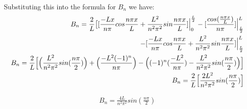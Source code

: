 \documentclass{article}
\begin{document}
Substituting this into the formula for $B_n$ we have:
\begin{equation}
\begin{aligned}
B_n = \frac{2}{L}\big{[}[ \frac{-Lx}{n\pi}cos\frac{n\pi x}{L} + \frac{L^2}{n^2\pi^2}sin\frac{n\pi x}{L}]\Big{|}^{\frac{L}{2}}_0 -[\frac{cos(\frac{n\pi x}{L})}{n\pi}]\Big{|}^L_{\frac{L}{2}}\\
-[\frac{-Lx}{n\pi}cos\frac{n\pi x}{L} + \frac{L^2}{n^2\pi^2}sin\frac{n\pi x}{L}]\Big{|}^L_{\frac{L}{2}}\\
B_n = \frac{2}{L}\Big{[}\Big{(}\frac{L^2}{n^2\pi^2}sin(\frac{n\pi}{2})\Big{)} + \Big{(}\frac{-L^2(-1)^n}{n\pi}\Big{)} - \Big{(}(-1)^n(\frac{-L^2}{n\pi}) - \frac{L^2}{n^2\pi^2}sin(\frac{n\pi}{2})\Big{)}\Big{]}\\
B_n = \frac{2}{L}\Big{[}\frac{2L^2}{n^2\pi^2}sin(\frac{n\pi}{2})\Big{]}
\end{aligned}
\end{equation}
\begin{tcolorbox}[minipage,colback=white,arc=0pt,outer arc=0pt]
\begin{equation}
\begin{aligned}
B_n = \frac{4L}{n^2\pi^2}sin(\frac{n\pi}{2})
\end{aligned}
\end{equation}
\end{tcolorbox}
\end{document}
